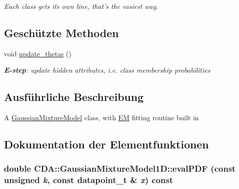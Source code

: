 \begin{DoxyCompactItemize}
\begin{DoxyCompactList}\small\item\em Each class gets its own line, that's the easiest way. \item\end{DoxyCompactList}\end{DoxyCompactItemize}
\subsection*{Geschützte Methoden}
\begin{DoxyCompactItemize}
\item 
\hypertarget{classCDA_1_1GaussianMixtureModel1D_ac8215fdb213641c0cf49eeb2f6d4c045}{
void \hyperlink{classCDA_1_1GaussianMixtureModel1D_ac8215fdb213641c0cf49eeb2f6d4c045}{update\_\-thetas} ()}
\label{classCDA_1_1GaussianMixtureModel1D_ac8215fdb213641c0cf49eeb2f6d4c045}

\begin{DoxyCompactList}\small\item\em {\bfseries E-\/step}: update hidden attributes, i.e. class membership probabilities \item\end{DoxyCompactList}\end{DoxyCompactItemize}


\subsection{Ausführliche Beschreibung}
A \hyperlink{classCDA_1_1GaussianMixtureModel}{GaussianMixtureModel} class, with \hyperlink{classCDA_1_1EM}{EM} fitting routine built in 

\subsection{Dokumentation der Elementfunktionen}
\hypertarget{classCDA_1_1GaussianMixtureModel1D_a0ee83653e92c833951631f300cfe338d}{
\subsubsection[{evalPDF}]{\setlength{\rightskip}{0pt plus 5cm}double CDA::GaussianMixtureModel1D::evalPDF (const unsigned {\em k}, \/  const {\bf datapoint\_\-t} \& {\em x}) const}}
\label{classCDA_1_1GaussianMixtureModel1D_a0ee83653e92c833951631f300cfe338d}


